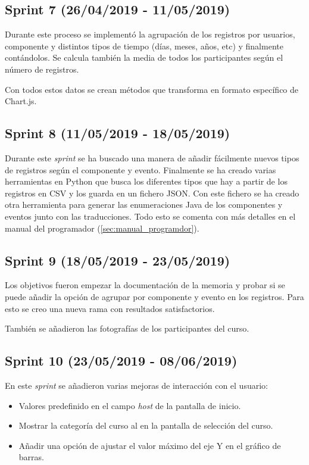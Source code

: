\subsection{Sprint 7 (26/04/2019 - 11/05/2019)}

Durante este proceso se implementó la agrupación de los registros por usuarios, componente y distintos tipos de tiempo (días, meses, años, etc) y finalmente contándolos. Se calcula también la media de todos los participantes según el número de registros.

Con todos estos datos se crean métodos que transforma en formato específico de Chart.js.

\subsection{Sprint 8 (11/05/2019 - 18/05/2019)}

Durante este \textit{sprint} se ha buscado una manera de añadir fácilmente nuevos tipos de registros según el componente y evento. Finalmente se ha creado varias herramientas en Python que busca los diferentes tipos que hay a partir de los registros en CSV y los guarda en un fichero JSON. Con este fichero se ha creado otra herramienta para generar las enumeraciones Java de los componentes y eventos junto con las traducciones. Todo esto se comenta con más detalles en el manual del programador (\ref{sec:manual_programdor}).

\subsection{Sprint 9 (18/05/2019 - 23/05/2019)}

Los objetivos fueron empezar la documentación de la memoria y probar si se puede añadir la opción de agrupar por componente y evento en los registros. Para esto se creo una nueva rama con resultados satisfactorios.

También se añadieron las fotografías de los participantes del curso.

\subsection{Sprint 10 (23/05/2019 - 08/06/2019)}

En este \textit{sprint} se añadieron varias mejoras de interacción con el usuario:
\begin{itemize}
	\item Valores predefinido en el campo \textit{host} de la pantalla de inicio.
	\item Mostrar la categoría del curso al en la pantalla de selección del curso.
	\item Añadir una opción de ajustar el valor máximo del eje Y en el gráfico de barras.
\end{itemize}

